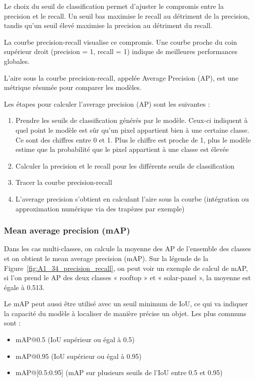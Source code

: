 Le choix du seuil de classification permet d'ajuster le compromis entre la precision et le recall. Un seuil bas maximise le recall au détriment de la precision, tandis qu'un seuil élevé maximise la precision au détriment du recall.

La courbe precision-recall visualise ce compromis. Une courbe proche du coin supérieur droit (precision = 1, recall = 1) indique de meilleures performances globales.

L'aire sous la courbe precision-recall, appelée Average Precision (AP), est une métrique résumée pour comparer les modèles.

Les étapes pour calculer l'average precision (AP) sont les suivantes :
\begin{enumerate}
    \item Prendre les seuils de classification générés par le modèle. Ceux-ci indiquent à quel point le modèle est sûr qu'un pixel appartient bien à une certaine classe. Ce sont des chiffres entre 0 et 1. Plus le chiffre est proche de 1, plus le modèle estime que la probabilité que le pixel appartient à une classe est élevée
    \item Calculer la precision et le recall pour les différents seuils de classification
    \item Tracer la courbe precision-recall
    \item L'average precision s'obtient en calculant l'aire sous la courbe (intégration ou approximation numérique via des trapèzes par exemple)
\end{enumerate}

\subsubsection{Mean average precision (mAP)}

Dans les cas multi-classes, on calcule la moyenne des AP de l'ensemble des classes et on obtient le mean average precision (mAP). Sur la légende de la Figure~\ref{fig:A1_34_precision_recall}, on peut voir un exemple de calcul de mAP, si l'on prend le AP des deux classes « rooftop » et « solar-panel », la moyenne est égale à 0.513.

Le mAP peut aussi être utilisé avec un seuil minimum de IoU, ce qui va indiquer la capacité du modèle à localiser de manière précise un objet. Les plus communs sont :
\begin{itemize}
    \item mAP@0.5 (IoU supérieur ou égal à 0.5)
    \item mAP@0.95 (IoU supérieur ou égal à 0.95)
    \item mAP@[0.5:0.95] (mAP sur plusieurs seuils de l'IoU entre 0.5 et 0.95)
\end{itemize}

